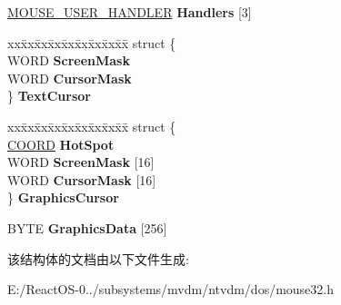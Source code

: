 \begin{DoxyCompactItemize}
\item 
\mbox{\label{struct___m_o_u_s_e___d_r_i_v_e_r___s_t_a_t_e_a0f58d7437b1eb6e323022b5dd1657cd9}} 
\hyperlink{struct___m_o_u_s_e___u_s_e_r___h_a_n_d_l_e_r}{M\+O\+U\+S\+E\+\_\+\+U\+S\+E\+R\+\_\+\+H\+A\+N\+D\+L\+ER} {\bfseries Handlers} \mbox{[}3\mbox{]}
\item 
\mbox{\label{struct___m_o_u_s_e___d_r_i_v_e_r___s_t_a_t_e_a6b6422d10021935246f8892bcc81780c}} 
\begin{tabbing}
xx\=xx\=xx\=xx\=xx\=xx\=xx\=xx\=xx\=\kill
struct \{\\
\>WORD {\bfseries ScreenMask}\\
\>WORD {\bfseries CursorMask}\\
\} {\bfseries TextCursor}\\

\end{tabbing}\item 
\mbox{\label{struct___m_o_u_s_e___d_r_i_v_e_r___s_t_a_t_e_ad1e00dc198924b7c02e8bb4624d46fc5}} 
\begin{tabbing}
xx\=xx\=xx\=xx\=xx\=xx\=xx\=xx\=xx\=\kill
struct \{\\
\>\hyperlink{struct___c_o_o_r_d}{COORD} {\bfseries HotSpot}\\
\>WORD {\bfseries ScreenMask} \mbox{[}16\mbox{]}\\
\>WORD {\bfseries CursorMask} \mbox{[}16\mbox{]}\\
\} {\bfseries GraphicsCursor}\\

\end{tabbing}\item 
\mbox{\label{struct___m_o_u_s_e___d_r_i_v_e_r___s_t_a_t_e_a772917f5b9f289fb49f23390d96146e7}} 
B\+Y\+TE {\bfseries Graphics\+Data} \mbox{[}256\mbox{]}
\end{DoxyCompactItemize}


该结构体的文档由以下文件生成\+:\begin{DoxyCompactItemize}
\item 
E\+:/\+React\+O\+S-\/0../subsystems/mvdm/ntvdm/dos/mouse32.\+h\end{DoxyCompactItemize}
